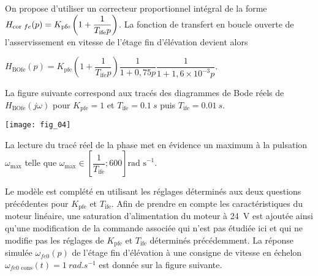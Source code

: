On propose d’utiliser un correcteur proportionnel intégral de la forme $H_{\text{cor }fe}(p)=K_{\text{\text{pfe}}}\left(1+\dfrac{1}{T_{\text{ife}}p}\right)$. La fonction de transfert en boucle ouverte de l’asservissement en vitesse de l’étage fin d’élévation devient alors 

$
H_{\text{BOfe}}(p)=K_{\text{pfe}}\left( 1+\dfrac{1}{T_{\text{ife}}p}\right) \dfrac{1}{1+0,75p} \dfrac{1}{1+1,6\times 10^{-3}p}
$.

La figure suivante correspond aux tracés des diagrammes de Bode réels de $H_{\text{BOfe}}(j\omega)$ 
pour $K_{\text{pfe}}=1$ et $T_{\text{ife}}=\SI{0,1}{s}$ puis $T_{\text{ife}}=\SI{0,01}{s}$.


\begin{marginfigure}
\texttt{[image: fig\_04]}
\end{marginfigure}


\ifprof
\begin{corrige}
\end{corrige}
\else
\fi

La lecture du tracé réel de la phase met en évidence un maximum à la pulsation $\omega_{\text{max}}$ telle que $\omega_{\text{max}}\in \left[\dfrac{1}{T_{\text{ife}}};600 \right]\text{rad s}^{-1}$.

\ifprof
\begin{corrige}
\end{corrige}
\else
\fi

\ifprof
\begin{corrige}
\end{corrige}
\else
\fi


Le modèle est complété en utilisant les réglages déterminés aux deux questions précédentes pour $K_{\text{pfe}}$ et $T_{\text{ife}}$. Afin de
prendre en compte les caractéristiques du moteur linéaire, une saturation d’alimentation du moteur à \SI{24}{V} est
ajoutée ainsi qu’une modification de la commande associée qui n’est pas étudiée ici et qui ne modifie pas les
réglages de $K_{\text{pfe}}$ et $T_{\text{ife}}$ déterminés précédemment. La réponse simulée $\omega_{fe0}(p)$ de l’étage fin d’élévation à une
consigne de vitesse en échelon $\omega_{fe0 \text{ cons}}(t) = \SI{1}{rad.s^{-1}}$ est donnée sur la figure suivante.

